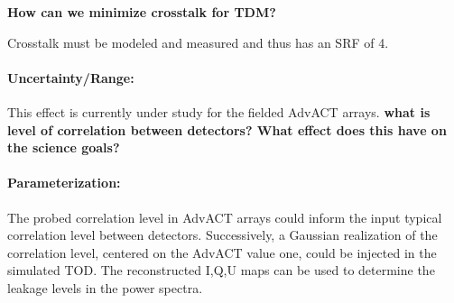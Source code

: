 \textbf{How can we minimize crosstalk for TDM?}

Crosstalk must be modeled and measured and thus has an SRF of 4.

\paragraph{Uncertainty/Range:}
This effect is currently under study for the fielded AdvACT arrays. \textbf{what is level of correlation between detectors? What effect does this have on the science goals?} 

\paragraph{Parameterization:}
The probed correlation level in AdvACT arrays could inform the input typical correlation level between detectors. Successively, a Gaussian realization of the correlation level, centered on the AdvACT value one, could be injected in the simulated TOD. The reconstructed I,Q,U maps can be used to determine the leakage levels in the power spectra. 
